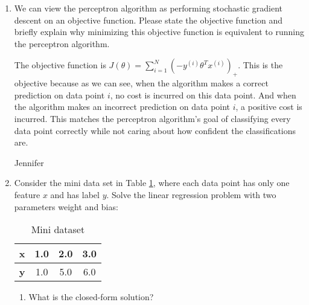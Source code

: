 \begin{enumerate}
    \begin{soln}
    (a), (b).
    \end{soln}
    
    \begin{qauthor}
        Jennifer    
    \end{qauthor}
    
    \item We can view the perceptron algorithm as performing stochastic gradient descent on an objective function. Please state the objective function and briefly explain why minimizing this objective function is equivalent to running the perceptron algorithm.
    
    \begin{soln}
    The objective function is $J(\theta) = \sum_{i=1}^{N} (-y^{(i)}\theta^Tx^{(i)})_+$. This is the objective because as we can see, when the algorithm makes a correct prediction on data point $i$, no cost is incurred on this data point. And when the algorithm makes an incorrect prediction on data point $i$, a positive cost is incurred. This matches the perceptron algorithm's goal of classifying every data point correctly while not caring about how confident the classifications are.
    \end{soln}
    
    \begin{qauthor}
    Jennifer
    \end{qauthor}
    
    \item Consider the mini data set in Table \ref{tab:minidata}, where each data point has only one feature $x$ and has label $y$. Solve the linear regression problem with two parameters weight and bias:\\
    
    \begin{table}[!hbtp]
        \centering
        \begin{tabular}{|c|c|c|c|}
        \hline
        \textbf{x} & 1.0 & 2.0 & 3.0\\   \hline 
        \textbf{y} & 1.0 & 5.0 & 6.0\\  \hline
        \end{tabular}
        \caption{Mini dataset}
        \label{tab:minidata}
    \end{table}
    
    \begin{enumerate}
        \item What is the closed-form solution?
        

\end{enumerate}
\end{enumerate}
